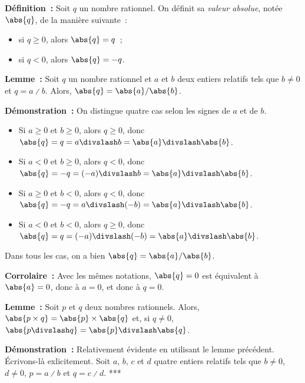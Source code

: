     \done

\medskip

\noindent\textbf{Définition :} Soit $q$ un nombre rationnel. 
    On définit sa \emph{valeur absolue}, notée $\abs{q}$, de la manière suivante : 
    \begin{itemize}[nosep]
        \item si $q \geq 0$, alors $\abs{q} = q$ ; 
        \item si $q < 0$, alors $\abs{q} = -q$.
    \end{itemize}

\medskip

\noindent\textbf{Lemme :} Soit $q$ un nombre rationnel et $a$ et $b$ deux entiers relatifs tels que $b \neq 0$ et $q = a \divslash b$.
    Alors, $\abs{q} = \abs{a} / \abs{b}$.

\medskip

\noindent\textbf{Démonstration :} On distingue quatre cas selon les signes de $a$ et de $b$.
    \begin{itemize}[nosep]
        \item Si $a \geq 0$ et $b \geq 0$, alors $q \geq 0$, donc $\abs{q} = q = a \divslash b = \abs{a} \divslash \abs{b}$.
        \item Si $a < 0$ et $b \geq 0$, alors $q < 0$, donc $\abs{q} = - q = (-a) \divslash b = \abs{a} \divslash \abs{b}$.
        \item Si $a \geq 0$ et $b < 0$, alors $q < 0$, donc $\abs{q} = - q = a \divslash (-b) = \abs{a} \divslash \abs{b}$.
        \item Si $a < 0$ et $b < 0$, alors $q \geq 0$, donc $\abs{q} = q = (-a) \divslash (-b) = \abs{a} \divslash \abs{b}$.
    \end{itemize}
    Dans tous les cas, on a bien $\abs{q} = \abs{a} / \abs{b}$.

    \done

\medskip

\noindent\textbf{Corrolaire :} Avec les mêmes notations, $\abs{q} = 0$ est équivalent à $\abs{a} = 0$, donc à $a = 0$, et donc à $q = 0$.

\medskip

\noindent\textbf{Lemme :} Soit $p$ et $q$ deux nombres rationnels.
    Alors, $\abs{p \times q} = \abs{p} \times \abs{q}$ et, si $q \neq 0$, $\abs{p \divslash q} = \abs{p} \divslash \abs{q}$.

\medskip

\noindent\textbf{Démonstration :} Relativement évidente en utilisant le lemme précédent. 
    Écrivons-là exlicitement.
    Soit $a$, $b$, $c$ et $d$ quatre entiers relatifs tels que $b \neq 0$, $d \neq 0$, $p = a \divslash b$ et $q = c \divslash d$.
    ***

